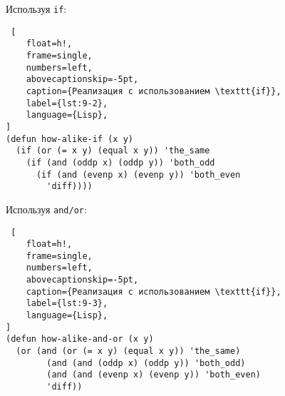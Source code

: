 Используя \texttt{if}:

\begin{lstlisting} [
	float=h!,
	frame=single,
	numbers=left,
	abovecaptionskip=-5pt,
	caption={Реализация с использованием \texttt{if}},
	label={lst:9-2},
	language={Lisp},
]
(defun how-alike-if (x y)
  (if (or (= x y) (equal x y)) 'the_same
    (if (and (oddp x) (oddp y)) 'both_odd
      (if (and (evenp x) (evenp y)) 'both_even
        'diff))))
\end{lstlisting}

Используя \texttt{and/or}:

\begin{lstlisting} [
	float=h!,
	frame=single,
	numbers=left,
	abovecaptionskip=-5pt,
	caption={Реализация с использованием \texttt{if}},
	label={lst:9-3},
	language={Lisp},
]
(defun how-alike-and-or (x y)
  (or (and (or (= x y) (equal x y)) 'the_same)
        (and (and (oddp x) (oddp y)) 'both_odd)
        (and (and (evenp x) (evenp y)) 'both_even) 
        'diff))
\end{lstlisting}